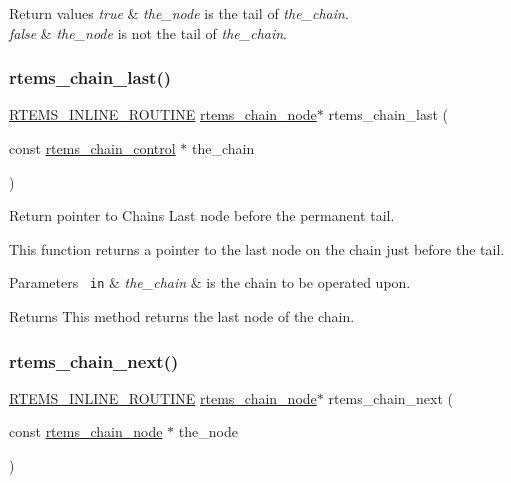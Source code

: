 \begin{DoxyRetVals}{Return values}
{\em true} & {\itshape the\+\_\+node} is the tail of {\itshape the\+\_\+chain}. \\
\hline
{\em false} & {\itshape the\+\_\+node} is not the tail of {\itshape the\+\_\+chain}. \\
\hline
\end{DoxyRetVals}
\mbox{\label{group__ClassicChains_gacf4f04f80c5d9e867686087fc0066006}} 
\subsubsection{\texorpdfstring{rtems\_chain\_last()}{rtems\_chain\_last()}}
{\footnotesize\ttfamily \mbox{\hyperlink{group__RTEMSScoreBaseDefs_gac216239df231d5dbd15e3520b0b9313f}{R\+T\+E\+M\+S\+\_\+\+I\+N\+L\+I\+N\+E\+\_\+\+R\+O\+U\+T\+I\+NE}} \mbox{\hyperlink{structChain__Node__struct}{rtems\+\_\+chain\+\_\+node}}$\ast$ rtems\+\_\+chain\+\_\+last (\begin{DoxyParamCaption}\item[{const \mbox{\hyperlink{unionChain__Control}{rtems\+\_\+chain\+\_\+control}} $\ast$}]{the\+\_\+chain }\end{DoxyParamCaption})}



Return pointer to Chain\textquotesingle{}s Last node before the permanent tail. 

This function returns a pointer to the last node on the chain just before the tail.


\begin{DoxyParams}[1]{Parameters}
\mbox{\texttt{ in}}  & {\em the\+\_\+chain} & is the chain to be operated upon.\\
\hline
\end{DoxyParams}
\begin{DoxyReturn}{Returns}
This method returns the last node of the chain. 
\end{DoxyReturn}
\mbox{\label{group__ClassicChains_ga53a35170adf0ff9075a2e04560777eab}} 
\subsubsection{\texorpdfstring{rtems\_chain\_next()}{rtems\_chain\_next()}}
{\footnotesize\ttfamily \mbox{\hyperlink{group__RTEMSScoreBaseDefs_gac216239df231d5dbd15e3520b0b9313f}{R\+T\+E\+M\+S\+\_\+\+I\+N\+L\+I\+N\+E\+\_\+\+R\+O\+U\+T\+I\+NE}} \mbox{\hyperlink{structChain__Node__struct}{rtems\+\_\+chain\+\_\+node}}$\ast$ rtems\+\_\+chain\+\_\+next (\begin{DoxyParamCaption}\item[{const \mbox{\hyperlink{structChain__Node__struct}{rtems\+\_\+chain\+\_\+node}} $\ast$}]{the\+\_\+node }\end{DoxyParamCaption})}



